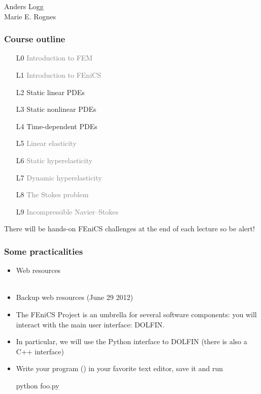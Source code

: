 \documentclass{fenicscourse}
\begin{document}
              {Anders Logg \\
               Marie E. Rognes}

\begin{frame}
  \frametitle{Course outline}

  \begin{enumerate}
  \item[L0]
    \textcolor{grey}{Introduction to FEM}
  \item[L1]
    \textcolor{grey}{Introduction to FEniCS}
  \item[L2]
    Static linear PDEs
  \item[L3]
    Static nonlinear PDEs
  \item[L4]
    Time-dependent PDEs
  \item[L5]
    \textcolor{grey}{Linear elasticity}
  \item[L6]
    \textcolor{grey}{Static hyperelasticity}
  \item[L7]
    \textcolor{grey}{Dynamic hyperelasticity}
  \item[L8]
    \textcolor{grey}{\textcolor{grey}{The Stokes problem}}
  \item[L9]
    \textcolor{grey}{Incompressible Navier--Stokes}
  \end{enumerate}

  There will be hands-on FEniCS challenges at the end of each lecture
  so be alert!


\end{frame}

\begin{frame}[fragile]
\frametitle{Some practicalities}

\begin{itemize}
\item Web resources \\
   \\
\item \alert{Backup web resources (June 29 2012)}
   \\
\item
  The FEniCS Project is an umbrella for several software components:
  you will interact with the main user interface: DOLFIN.
\item
  In particular, we will use the Python interface to DOLFIN (there is
  also a C++ interface)
\item
  Write your program () in your favorite text editor, save
  it and run
  \vspace{-1em}
  \begin{bash}
    python foo.py
  \end{bash}
\end{itemize}

\end{frame}
\end{document}
